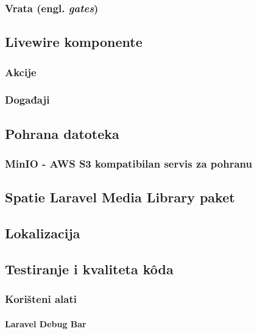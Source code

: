 \subsubsection{Vrata (engl. \textit{gates})}

\subsection{Livewire komponente}

\subsubsection{Akcije}

\subsubsection{Događaji}

\subsection{Pohrana datoteka}

\subsubsection{MinIO - AWS S3 kompatibilan servis za pohranu}

\subsection{Spatie Laravel Media Library paket}

\subsection{Lokalizacija}

\subsection{Testiranje i kvaliteta k\^oda}

\subsubsection{Korišteni alati}

\paragraph{Laravel Debug Bar}

